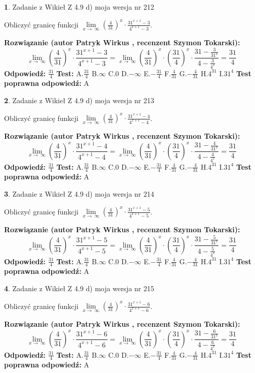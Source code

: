 \documentclass[12pt, a4paper]{article}
\theoremstyle{definition} %
\newtheorem{zad}{}
\newcommand{\zadStart}[1]{\begin{zad}#1\newline}
\newcommand{\zadStop}{\end{zad}}
\newcommand{\rozwStart}[2]{\noindent \textbf{Rozwiązanie (autor #1 , recenzent #2): }\newline}
\newcommand{\rozwStop}{\newline}
\newcommand{\odpStart}{\noindent \textbf{Odpowiedź:}\newline}
\newcommand{\odpStop}{\newline}
\newcommand{\testStart}{\noindent \textbf{Test:}\newline}
\newcommand{\testStop}{\newline}
\newcommand{\kluczStart}{\noindent \textbf{Test poprawna odpowiedź:}\newline}
\newcommand{\kluczStop}{\newline}
\begin{document}
\zadStart{Zadanie z Wikieł Z 4.9 d) moja wersja nr 212}


Obliczyć granicę funkcji  $\lim\limits_{x\to\ \infty}(\frac{4}{31})^{x}\cdot\frac{31^{x+1}-3}{4^{x+1}-3}$.
\zadStop
\rozwStart{Patryk Wirkus}{Szymon Tokarski}
$$\lim\limits_{x\to\ \infty}(\frac{4}{31})^{x}\cdot\frac{31^{x+1}-3}{4^{x+1}-3}=\lim\limits_{x\to\ \infty}(\frac{4}{31})^{x}\cdot(\frac{31}{4})^{x} \cdot \frac{31-\frac{3}{31^{x}}}{4-\frac{3}{4^{x}}} = \frac{31}{4}$$
\rozwStop
\odpStart
$\frac{31}{4}$
\odpStop
\testStart
A.$\frac{31}{4}$ B.$\infty$ C.$0$ D.$-\infty$ E.$-\frac{31}{4}$
F.$\frac{4}{31}$ G.$-\frac{4}{31}$
H.$4^{31}$
I.$31^{4}$
\testStop
\kluczStart
A
\kluczStop



\zadStart{Zadanie z Wikieł Z 4.9 d) moja wersja nr 213}


Obliczyć granicę funkcji  $\lim\limits_{x\to\ \infty}(\frac{4}{31})^{x}\cdot\frac{31^{x+1}-4}{4^{x+1}-4}$.
\zadStop
\rozwStart{Patryk Wirkus}{Szymon Tokarski}
$$\lim\limits_{x\to\ \infty}(\frac{4}{31})^{x}\cdot\frac{31^{x+1}-4}{4^{x+1}-4}=\lim\limits_{x\to\ \infty}(\frac{4}{31})^{x}\cdot(\frac{31}{4})^{x} \cdot \frac{31-\frac{4}{31^{x}}}{4-\frac{4}{4^{x}}} = \frac{31}{4}$$
\rozwStop
\odpStart
$\frac{31}{4}$
\odpStop
\testStart
A.$\frac{31}{4}$ B.$\infty$ C.$0$ D.$-\infty$ E.$-\frac{31}{4}$
F.$\frac{4}{31}$ G.$-\frac{4}{31}$
H.$4^{31}$
I.$31^{4}$
\testStop
\kluczStart
A
\kluczStop



\zadStart{Zadanie z Wikieł Z 4.9 d) moja wersja nr 214}


Obliczyć granicę funkcji  $\lim\limits_{x\to\ \infty}(\frac{4}{31})^{x}\cdot\frac{31^{x+1}-5}{4^{x+1}-5}$.
\zadStop
\rozwStart{Patryk Wirkus}{Szymon Tokarski}
$$\lim\limits_{x\to\ \infty}(\frac{4}{31})^{x}\cdot\frac{31^{x+1}-5}{4^{x+1}-5}=\lim\limits_{x\to\ \infty}(\frac{4}{31})^{x}\cdot(\frac{31}{4})^{x} \cdot \frac{31-\frac{5}{31^{x}}}{4-\frac{5}{4^{x}}} = \frac{31}{4}$$
\rozwStop
\odpStart
$\frac{31}{4}$
\odpStop
\testStart
A.$\frac{31}{4}$ B.$\infty$ C.$0$ D.$-\infty$ E.$-\frac{31}{4}$
F.$\frac{4}{31}$ G.$-\frac{4}{31}$
H.$4^{31}$
I.$31^{4}$
\testStop
\kluczStart
A
\kluczStop



\zadStart{Zadanie z Wikieł Z 4.9 d) moja wersja nr 215}


Obliczyć granicę funkcji  $\lim\limits_{x\to\ \infty}(\frac{4}{31})^{x}\cdot\frac{31^{x+1}-6}{4^{x+1}-6}$.
\zadStop
\rozwStart{Patryk Wirkus}{Szymon Tokarski}
$$\lim\limits_{x\to\ \infty}(\frac{4}{31})^{x}\cdot\frac{31^{x+1}-6}{4^{x+1}-6}=\lim\limits_{x\to\ \infty}(\frac{4}{31})^{x}\cdot(\frac{31}{4})^{x} \cdot \frac{31-\frac{6}{31^{x}}}{4-\frac{6}{4^{x}}} = \frac{31}{4}$$
\rozwStop
\odpStart
$\frac{31}{4}$
\odpStop
\testStart
A.$\frac{31}{4}$ B.$\infty$ C.$0$ D.$-\infty$ E.$-\frac{31}{4}$
F.$\frac{4}{31}$ G.$-\frac{4}{31}$
H.$4^{31}$
I.$31^{4}$
\testStop
\kluczStart
A
\kluczStop
\end{document}
